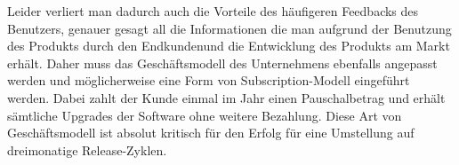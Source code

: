 Leider verliert man dadurch auch die Vorteile des häufigeren Feedbacks des Benutzers, genauer gesagt all die Informationen die man aufgrund der Benutzung des Produkts durch den Endkundenund die Entwicklung des Produkts am Markt erhält. Daher muss das
Geschäftsmodell des Unternehmens ebenfalls angepasst werden und möglicherweise
eine Form von Subscription-Modell eingeführt werden. Dabei zahlt der Kunde
einmal im Jahr einen Pauschalbetrag und erhält sämtliche Upgrades der Software
ohne weitere Bezahlung. Diese Art von Geschäftsmodell ist absolut kritisch für
den Erfolg für eine Umstellung auf dreimonatige Release-Zyklen.
